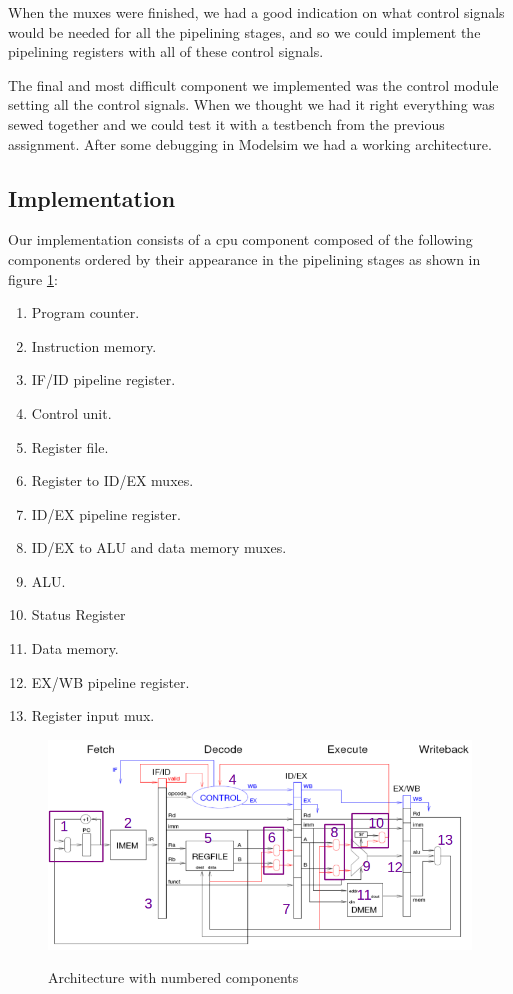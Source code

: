 \documentclass[11pt]{report}
\begin{document}
When the muxes were finished, we had a good indication on what control
signals would be needed for all the pipelining stages, and so we could 
implement the pipelining registers with all of these control signals.

The final and most difficult component we implemented was the control
module setting all the control signals. When we thought we had it right
everything was sewed together and we could test it with a testbench
from the previous assignment. After some debugging in Modelsim we had 
a working architecture.

\subsection*{Implementation}

Our implementation consists of a cpu component composed of
the following components ordered by their appearance 
in the pipelining stages as shown in figure \ref{fig:archnumbered}:
	
\begin{enumerate}
\item Program counter.
\item Instruction memory.
\item IF/ID pipeline register.
\item Control unit.
\item Register file.
\item Register to ID/EX muxes.
\item ID/EX pipeline register.
\item ID/EX to ALU and data memory muxes.
\item ALU.
\item Status Register
\item Data memory.
\item EX/WB pipeline register.
\item Register input mux.
\end{enumerate}

\begin{figure}[htbp]
  \centering
  \includegraphics[width=0.95\linewidth]{toplevelmarked.png} \\
  \caption{Architecture with numbered components}
  \label{fig:archnumbered}
\end{figure}
	
\end{document}

